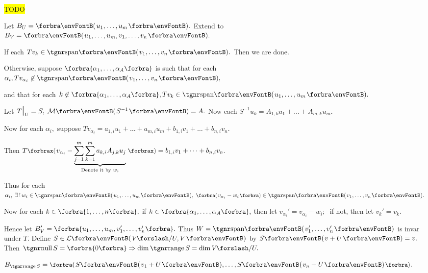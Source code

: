 \documentclass[a4paper, 11pt, UTF8]{article}
\begin{document}
\begin{large}
\par\quad
\colorbox{yellow}{TODO}\par\quad
\par\quad
\par\quad
{}\par\quad
Let $B_U=\Par{u_1,\dots,u_m}.$ Extend to $B_V=\Par{u_1,\dots,u_m,v_1,\dots,v_n}.$\par\quad
If each $Tv_k\in\Span{v_1,\dots,v_n}.$ Then we are done.\par\quad
Otherwise, suppose $\Bra{\alpha_1,\dots,\alpha_A}$ is such that for each $\alpha_i,Tv_{\alpha_i}\not\in\Span{v_1,\dots,v_n},$\par\quad
{} and that for each $k\not\in\Bra{\alpha_1,\dots,\alpha_A},Tv_k\in\Span{u_1,\dots,u_m}.$\par\quad
Let $T\mid_U=S,\;\Mt{S^{-1}}=A.$ Now each $S^{-1}u_k=A_{1,k}u_1+\dots+A_{m,k}u_m.$\par\quad
Now for each $\alpha_i,$ suppose $Tv_{\alpha_i}=a_{1,i}u_1+\dots+a_{m,i}u_m+b_{1,i}v_1+\dots+b_{n,i}v_n.$\vspace{2pt}\par\quad
Then $T\XPar{v_{\alpha_i}-\underbrace{\sum_{j=1}^{m}\sum_{k=1}^{m}a_{k,i}A_{j,k}u_j}_{\text{Denote it by }w_{i}}}=b_{1,i}v_1+\dots+b_{n,i}v_n.$\vspace{2pt}\par\quad
Thus for each $\alpha_i,\;\exists\,!\,w_i\in\Span{u_1,\dots,u_m},\;\BigPar{v_{\alpha_i}-w_i}\in\Span{v_1,\dots,v_n}.$\par\quad
Now for each $k\in\Bra{1,\dots,n},$ if $k\in\Bra{\alpha_1,\dots,\alpha_A},$ then let $v_{\alpha_i}'=v_{\alpha_i}-w_i;\;$ if not, then let $v_k'=v_k.$\par\quad
Hence let $B_V'=\Bra{u_1,\dots,u_m,v_1',\dots,v_n'}.$ Thus $W=\Span{v_1',\dots,v_n'}$ is invar under $T.$\PfEnd\vspace{6pt}\quad
\Or Define $S\in\Lm{V\mySlash U,V}$ by $S\Par{v+U}=v.$ Then $\null S=\zeroSubs\Rightarrow\dim\range S=\dim V\mySlash U.$\par\quad
$B_{\range S}=\BigPar{S\Par{v_1+U},\dots,S\Par{v_n+U}}.$\par\quad
\SepLine\pagebreak

\par
\SepLine


\end{large}
\end{document}
